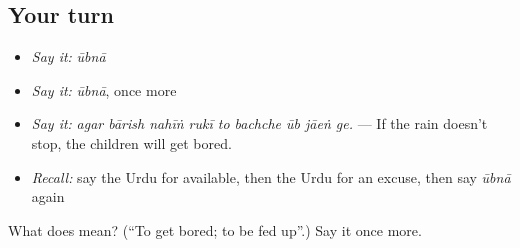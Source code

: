 \subsection*{Your turn}
\begin{itemize}
\raggedright
  \item \emph{Say it:} \emph{ūbnā}
  \item \emph{Say it:} \emph{ūbnā}, once more
  \item \emph{Say it:} \emph{agar bārish nahīṅ rukī to bachche ūb jāeṅ ge.} — If the rain doesn't stop, the children will get bored.
  \item \emph{Recall:} say the Urdu for available, then the Urdu for an excuse, then say \emph{ūbnā} again
\end{itemize}

\begin{tcolorbox}[breakable,colback=teal!4,colframe=teal!35!black,title={Before you move on}]
What does  mean? (\textquotedblleft{}To get bored; to be fed up\textquotedblright{}.) Say it once more.
\end{tcolorbox}
